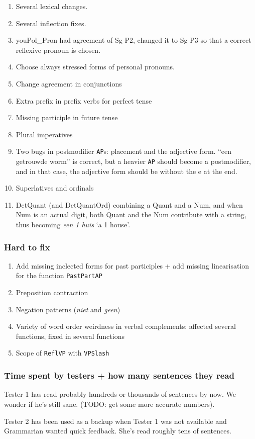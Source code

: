 \begin{enumerate}
\def\labelenumi{\arabic{enumi}.}
\itemsep1pt\parskip0pt
\item
  Several lexical changes.
\item
  Several inflection fixes.
\item
  youPol\_Pron had agreement of Sg P2, changed it to Sg P3 so that a
  correct reflexive pronoun is chosen.
\item
  Choose always stressed forms of personal pronouns.
\item
  Change agreement in conjunctions
\item
  Extra prefix in prefix verbs for perfect tense
\item
  Missing participle in future tense
\item
  Plural imperatives
\item
  Two bugs in postmodifier \texttt{AP}s: placement and the adjective
  form. ``een getrouwde worm'' is correct, but a heavier \texttt{AP}
  should become a postmodifier, and in that case, the adjective form
  should be without the e at the end.
\item
  Superlatives and ordinals
\item
  DetQuant (and DetQuantOrd) combining a Quant and a Num, and when Num
  is an actual digit, both Quant and the Num contribute with a string,
  thus becoming \emph{een 1 huis} `a 1 house'.
\end{enumerate}

\subsubsection{Hard to fix}\label{hard-to-fix}

\begin{enumerate}
\def\labelenumi{\arabic{enumi}.}
\itemsep1pt\parskip0pt
\item
  Add missing inclected forms for past participles + add missing
  linearisation for the function \texttt{PastPartAP}
\item
  Preposition contraction
\item
  Negation patterns (\emph{niet} and \emph{geen})
\item
  Variety of word order weirdness in verbal complements: affected
  several functions, fixed in several functions
\item
  Scope of \texttt{ReflVP} with \texttt{VPSlash}
\end{enumerate}

\subsubsection{Time spent by testers + how many sentences they
read}\label{time-spent-by-testers-how-many-sentences-they-read}

Tester 1 has read probably hundreds or thousands of sentences by now. We
wonder if he's still sane. (TODO: get some more accurate numbers).

Tester 2 has been used as a backup when Tester 1 was not available and
Grammarian wanted quick feedback. She's read roughly tens of sentences.